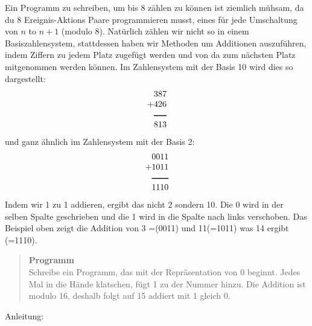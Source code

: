 \medskip




Ein Programm zu schreiben, um bis 8 zählen zu können ist ziemlich mühsam, da du 8 Ereignis-Aktions Paare programmieren musst, eines für jede Umschaltung von $n$ to $n+1$ (modulo 8). 
Natürlich zählen wir nicht so in einem Basiszahlensystem, stattdessen haben wir Methoden um Additionen auszuführen, indem Ziffern zu jedem Platz zugefügt werden und von da zum nächsten Platz mitgenommen werden können.
Im Zahlensystem mit der Basis 10 wird dies so dargestellt:
\begin{displaymath}
\begin{array}{r}
387\\
+426\\
\rule[1pt]{1.5em}{1pt}\\
813\\
\end{array}
\end{displaymath}
und ganz ähnlich im Zahlensystem mit der Basis 2:
\begin{displaymath}
\begin{array}{r}
0011\\
+1011\\
\rule[1pt]{2em}{1pt}\\
1110\\
\end{array}
\end{displaymath}
Indem wir 1 zu 1 addieren, ergibt das nicht 2 sondern 10. Die 0 wird in der selben Spalte geschrieben und die 1 wird in die Spalte nach links verschoben. Das Beispiel oben zeigt die Addition von 3 =(0011) und 11(=1011) was 14 ergibt (=1110).


\begin{quote}
\textbf{Programm}\\
Schreibe ein Programm, das mit der Repräsentation von 0 beginnt. Jedes Mal in die Hände klatschen, fügt 1 zu der Nummer hinzu. Die Addition ist modulo 16, deshalb folgt auf 15 addiert mit 1 gleich 0.
\end{quote}

Anleitung:

